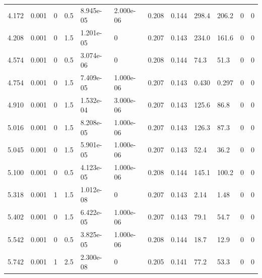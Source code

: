 \documentclass[preview]{standalone}
\begin{document}
{{\begin{tabular}{L{1.2cm}C{1.2cm} C{0.3cm}C{0.5cm} C{1.4cm}C{1.4cm} C{1.4cm}C{1.4cm} C{1.6cm}C{1.6cm} C{1.6cm}C{1.6cm}}
  4.172  &  0.001  & 0     & 0.5 &  8.945e-05  & 2.000e-06  &  0.208&   0.144& 298.4 & 206.2   &  0 & 0  \\ 
  4.208  &  0.001  & 0     & 1.5 &  1.201e-05  & 0  &  0.207&   0.143& 234.0 & 161.6   &  0 & 0  \\ 
  4.574  &  0.001  & 0     & 0.5 &  3.074e-06  & 0  &  0.208&   0.144& 74.3 & 51.3   &  0 & 0  \\ 
  4.754  &  0.001  & 0     & 1.5 &  7.409e-05  & 1.000e-06  &  0.207&   0.143& 0.430 & 0.297   &  0 & 0  \\ 
  4.910  &  0.001  & 0     & 1.5 &  1.532e-04  & 3.000e-06  &  0.207&   0.143& 125.6 & 86.8   &  0 & 0  \\ 
  5.016  &  0.001  & 0     & 1.5 &  8.208e-05  & 1.000e-06  &  0.207&   0.143& 126.3 & 87.3   &  0 & 0  \\ 
  5.045  &  0.001  & 0     & 1.5 &  5.901e-05  & 1.000e-06  &  0.207&   0.143& 52.4 & 36.2   &  0 & 0  \\ 
  5.100  &  0.001  & 0     & 0.5 &  4.123e-05  & 1.000e-06  &  0.208&   0.144& 145.1 & 100.2   &  0 & 0  \\ 
  5.318  &  0.001  & 1     & 1.5 &  1.012e-08  & 0  &  0.207&   0.143& 2.14 & 1.48   &  0 & 0  \\ 
  5.402  &  0.001  & 0     & 1.5 &  6.422e-05  & 1.000e-06  &  0.207&   0.143& 79.1 & 54.7   &  0 & 0  \\ 
  5.542  &  0.001  & 0     & 0.5 &  3.825e-05  & 1.000e-06  &  0.208&   0.144& 18.7 & 12.9   &  0 & 0  \\ 
  5.742  &  0.001  & 1     & 2.5 &  2.300e-08  & 0  &  0.205&   0.141& 77.2 & 53.3   &  0 & 0  \\ 
\hline 
\end{tabular} 

}}
\end{document}
